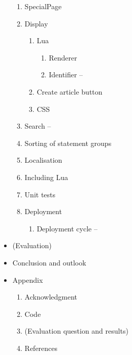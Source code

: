 \documentclass[11pt]{article}
\begin{document}
\begin{itemize}
  \begin{enumerate}
   \item SpecialPage
   \item Display
   \begin{enumerate}
    \item Lua
    \begin{enumerate}
		\item Renderer
		\item Identifier --
    \end{enumerate}
    \item Create article button
    \item CSS
   \end{enumerate}
    \item Search --
    \item Sorting of statement groups
    \item Localisation
   \item Including Lua
    \item Unit tests
   \item Deployment
   \begin{enumerate}
    \item Deployment cycle --
   \end{enumerate}
  \end{enumerate}
  \item (Evaluation)
  \item Conclusion and outlook
  \item Appendix
  \begin{enumerate}
	  \item Acknowledgment
	  \item Code
	  \item (Evaluation question and results)
	  \item References
  \end{enumerate}
\end{itemize}
\end{document}
